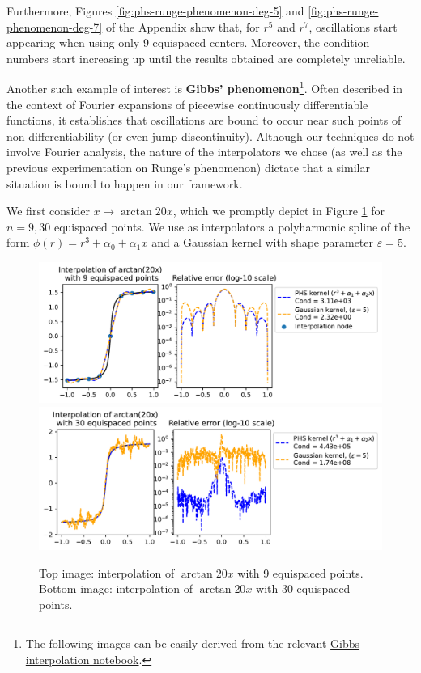\documentclass[12pt]{report} %
\begin{document}
Furthermore, Figures \ref{fig:phs-runge-phenomenon-deg-5} and \ref{fig:phs-runge-phenomenon-deg-7} of the Appendix show that, for $r^5$ and $r^7$, oscillations start appearing when using only 9 equispaced centers. Moreover, the condition numbers start increasing up until the results obtained are completely unreliable.

Another such example of interest is \textbf{Gibbs' phenomenon}\footnote{The following images can be easily derived from the relevant \href{https://github.com/heqro/tfm-experiments/blob/main/introductory_notebooks/rbf_interpolation/gibbs_rbf_and_phs.ipynb}{Gibbs interpolation notebook}.}. Often described in the context of Fourier expansions of piecewise continuously differentiable functions, it establishes that oscillations are bound to occur near such points of non-differentiability (or even jump discontinuity).
Although our techniques do not involve Fourier analysis, the nature of the interpolators we chose (as well as the previous experimentation on Runge's phenomenon) dictate that a similar situation is bound to happen in our framework.

We first consider $x \mapsto \arctan{20x}$, which we promptly depict in Figure \ref{fig:arctan-with-points} for $n=9, 30$ equispaced points. We use as interpolators a polyharmonic spline of the form $\phi(r) = r^3+\alpha_0+\alpha_1 x$ and a Gaussian kernel with shape parameter $\varepsilon=5$.

\begin{figure}[ht]
  \centering
  \includegraphics[width=\textwidth]{imagenes/experiments/1d/intro/arctan-with-9-pts.pdf}
  \includegraphics[width=\textwidth]{imagenes/experiments/1d/intro/arctan-with-30-pts.pdf}
  \caption{Top image: interpolation of $\arctan{20x}$ with 9 equispaced points. Bottom image: interpolation of $\arctan{20x}$ with 30 equispaced points. }
  \label{fig:arctan-with-points}
\end{figure}
\end{document}
